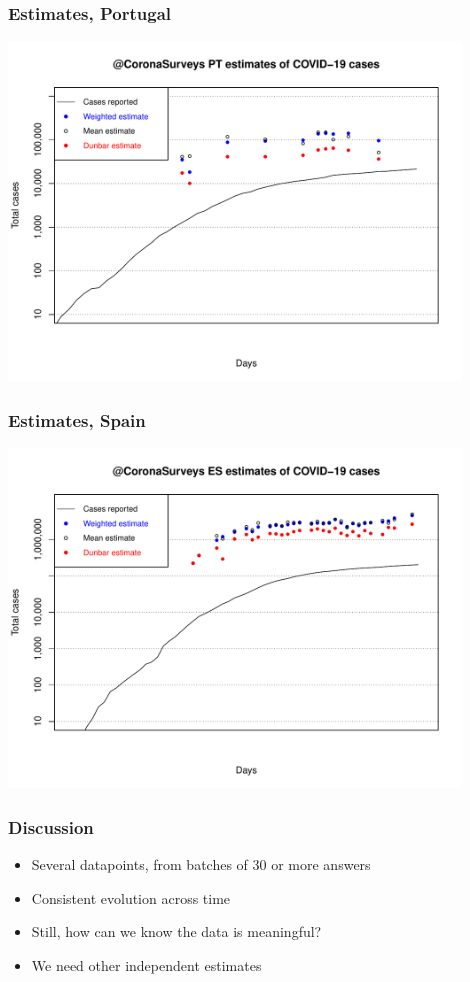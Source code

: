 \documentclass{beamer}
\begin{document}
\begin{frame}
  \frametitle{Estimates, Portugal}
  \begin{center}
  \includegraphics[width=0.9\textwidth]{PTEst1.pdf}
  \end{center}
\end{frame}

\begin{frame}
  \frametitle{Estimates, Spain}
  \begin{center}
  \includegraphics[width=0.9\textwidth]{ESEst1.pdf}
  \end{center}
\end{frame}


\begin{frame}
  \frametitle{Discussion}

  \begin{itemize}
    \item Several datapoints, from batches of 30 or more answers  
    \item Consistent evolution across time
  \end{itemize} \pause

  \begin{itemize}
    \item Still, how can we know the data is meaningful?   
    \item We need other independent estimates 
  \end{itemize}

\end{frame}
\end{document}
